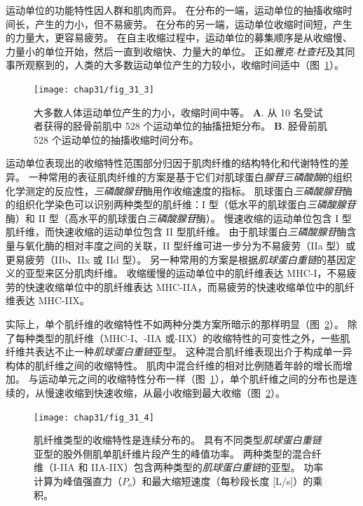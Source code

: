 运动单位的功能特性因人群和肌肉而异。
在分布的一端，运动单位的抽搐收缩时间长，产生的力小，但不易疲劳。
在分布的另一端，运动单位收缩时间短，产生的力量大，更容易疲劳。
在自主收缩过程中，运动单位的募集顺序是从收缩慢、力量小的单位开始，然后一直到收缩快、力量大的单位。 
正如\textit{雅克$\cdot$杜查托}及其同事所观察到的，人类的大多数运动单位产生的力较小，收缩时间适中（图~\ref{fig:31_3}）。


\begin{figure}[htbp]
	\centering
	\texttt{[image: chap31/fig\_31\_3]}
	\caption{大多数人体运动单位产生的力小，收缩时间中等\cite{cutsem1997mechanical}。
	\textbf{A}. 从 10 名受试者获得的胫骨前肌中 528 个运动单位的抽搐扭矩分布。
	\textbf{B}. 胫骨前肌 528 个运动单位的抽搐收缩时间分布。}
	\label{fig:31_3}
\end{figure}


运动单位表现出的收缩特性范围部分归因于肌肉纤维的结构特化和代谢特性的差异。
一种常用的表征肌肉纤维的方案是基于它们对肌球蛋白\textit{腺苷三磷酸酶}的组织化学测定的反应性，\textit{三磷酸腺苷}酶用作收缩速度的指标。
肌球蛋白\textit{三磷酸腺苷}酶的组织化学染色可以识别两种类型的肌纤维：I 型（低水平的肌球蛋白\textit{三磷酸腺苷}酶）和 II 型（高水平的肌球蛋白\textit{三磷酸腺苷}酶）。
慢速收缩的运动单位包含 I 型肌纤维，而快速收缩的运动单位包含 II 型肌纤维。
由于肌球蛋白\textit{三磷酸腺苷}酶含量与氧化酶的相对丰度之间的关联，II 型纤维可进一步分为不易疲劳（IIa 型）或更易疲劳（IIb、IIx 或 IId 型）。
另一种常用的方案是根据\textit{肌球蛋白重链}的基因定义的亚型来区分肌肉纤维。
收缩缓慢的运动单位中的肌纤维表达 MHC-I，不易疲劳的快速收缩单位中的肌纤维表达 MHC-IIA，而易疲劳的快速收缩单位中的肌纤维表达 MHC-IIX。


实际上，单个肌纤维的收缩特性不如两种分类方案所暗示的那样明显（图~\ref{fig:31_4}）。
除了每种类型的肌纤维（MHC-I、-IIA 或-IIX）的收缩特性的可变性之外，一些肌纤维共表达不止一种\textit{肌球蛋白重链}亚型。
这种混合肌纤维表现出介于构成单一异构体的肌纤维之间的收缩特性。
肌肉中混合纤维的相对比例随着年龄的增长而增加。
与运动单元之间的收缩特性分布一样（图~\ref{fig:31_3}），单个肌纤维之间的分布也是连续的，从慢速收缩到快速收缩，从最小收缩到最大收缩（图~\ref{fig:31_4}）。


\begin{figure}[htbp]
	\centering
	\texttt{[image: chap31/fig\_31\_4]}
	\caption{肌纤维类型的收缩特性是连续分布的。
	具有不同类型\textit{肌球蛋白重链}亚型的股外侧肌单肌纤维片段产生的峰值功率。
	两种类型的混合纤维（I-IIA 和 IIA-IIX）包含两种类型的\textit{肌球蛋白重链}的亚型。
	功率计算为峰值强直力（$P_o$）和最大缩短速度（每秒段长度 [L/s]）的乘积\cite{bottinelli1996force}。}
	\label{fig:31_4}
\end{figure}



